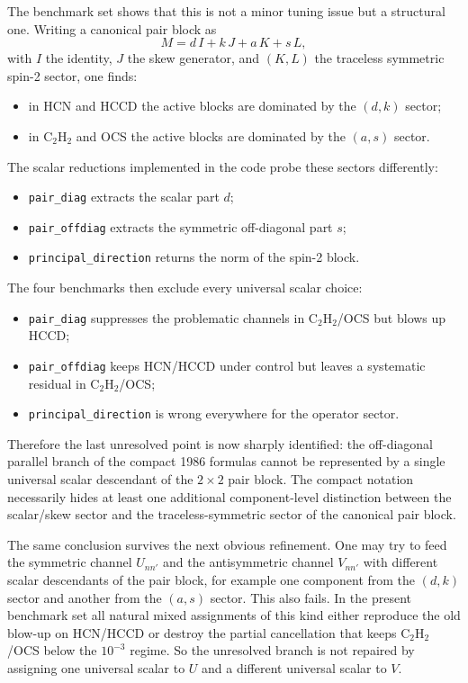 \documentclass[11pt]{article}
\begin{document}
The benchmark set shows that this is not a minor tuning issue but a structural
one. Writing a canonical pair block as
\[
M=d\,I+k\,J+a\,K+s\,L,
\]
with $I$ the identity, $J$ the skew generator, and $(K,L)$ the traceless
symmetric spin-2 sector, one finds:
\begin{itemize}
\item in HCN and HCCD the active blocks are dominated by the $(d,k)$ sector;
\item in C$_2$H$_2$ and OCS the active blocks are dominated by the $(a,s)$
sector.
\end{itemize}
The scalar reductions implemented in the code probe these sectors differently:
\begin{itemize}
\item \texttt{pair\_diag} extracts the scalar part $d$;
\item \texttt{pair\_offdiag} extracts the symmetric off-diagonal part $s$;
\item \texttt{principal\_direction} returns the norm of the spin-2 block.
\end{itemize}
The four benchmarks then exclude every universal scalar choice:
\begin{itemize}
\item \texttt{pair\_diag} suppresses the problematic channels in
C$_2$H$_2$/OCS but blows up HCCD;
\item \texttt{pair\_offdiag} keeps HCN/HCCD under control but leaves a
systematic residual in C$_2$H$_2$/OCS;
\item \texttt{principal\_direction} is wrong everywhere for the operator
sector.
\end{itemize}
Therefore the last unresolved point is now sharply identified: the off-diagonal
parallel branch of the compact 1986 formulas cannot be represented by a single
universal scalar descendant of the $2\times2$ pair block. The compact
notation necessarily hides at least one additional component-level distinction
between the scalar/skew sector and the traceless-symmetric sector of the
canonical pair block.

The same conclusion survives the next obvious refinement. One may try to feed
the symmetric channel $U_{nn'}$ and the antisymmetric channel $V_{nn'}$ with
different scalar descendants of the pair block, for example one component from
the $(d,k)$ sector and another from the $(a,s)$ sector. This also fails. In
the present benchmark set all natural mixed assignments of this kind either
reproduce the old blow-up on HCN/HCCD or destroy the partial cancellation that
keeps C$_2$H$_2$/OCS below the $10^{-3}$ regime. So the unresolved branch is
not repaired by assigning one universal scalar to $U$ and a different
universal scalar to $V$.
\end{document}
